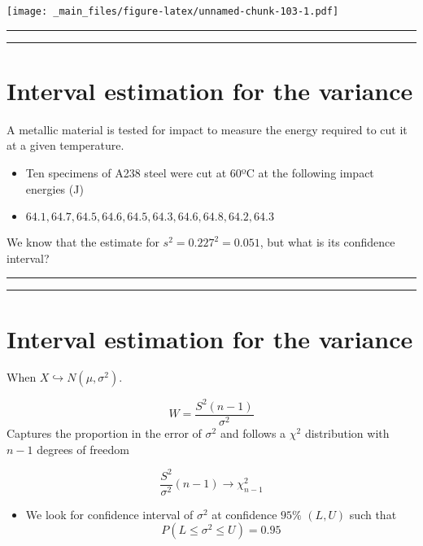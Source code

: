 \documentclass[
]{book}
\providecommand{\tightlist}{%
  \setlength{\itemsep}{0pt}\setlength{\parskip}{0pt}}
\begin{document}
\texttt{[image: \_main\_files/figure-latex/unnamed-chunk-103-1.pdf]}

\begin{center}\rule{0.5\linewidth}{0.5pt}\end{center}

\begin{center}\rule{0.5\linewidth}{0.5pt}\end{center}

\hypertarget{interval-estimation-for-the-variance}{%
\section{Interval estimation for the variance}\label{interval-estimation-for-the-variance}}

A metallic material is tested for impact to measure the energy required to cut it at a given temperature.

\begin{itemize}
\item
  Ten specimens of A238 steel were cut at 60ºC at the following impact energies (J)
\item
  \(64.1, 64.7, 64.5, 64.6, 64.5, 64.3, 64.6, 64.8, 64.2, 64.3\)
\end{itemize}

We know that the estimate for \(s^2=0.227^2=0.051\), but what is its confidence interval?

\begin{center}\rule{0.5\linewidth}{0.5pt}\end{center}

\begin{center}\rule{0.5\linewidth}{0.5pt}\end{center}

\hypertarget{interval-estimation-for-the-variance-1}{%
\section{Interval estimation for the variance}\label{interval-estimation-for-the-variance-1}}

When \(X \hookrightarrow N(\mu, \sigma^2)\).

\[W=\frac{S^2(n-1)}{\sigma^2}\]
Captures the proportion in the error of \(\sigma^2\) and
follows a \(\chi^2\) distribution with \(n-1\) degrees of freedom

\[\frac{S^2}{\sigma^2}(n-1)\rightarrow \chi^2_{n-1}\]

\begin{itemize}
\tightlist
\item
  We look for confidence interval of \(\sigma^2\) at confidence \(95\%\) \((L,U)\) such that \[P(L \leq \sigma^2 \leq U)=0.95\]
\end{itemize}
\end{document}
